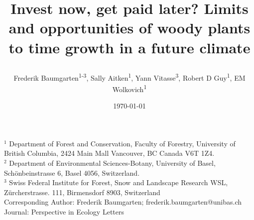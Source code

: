 \documentclass{article}
\begin{document}
	
	
	\title{Invest now, get paid later? Limits and opportunities of woody plants to time growth in a future climate %
		
		
		
		
	
	} 
	
	\date{\today}
	\author{Frederik Baumgarten\textsuperscript{1-3}, Sally Aitken\textsuperscript{1}, Yann Vitasse\textsuperscript{3}, Robert D Guy\textsuperscript{1}, EM Wolkovich\textsuperscript{1}}
	\maketitle
	
	$^1$ Department of Forest and Conservation, Faculty of Forestry, University of British Columbia, 2424 Main Mall
	Vancouver, BC Canada V6T 1Z4. \\
	
	$^2$  
	Department of Environmental Sciences-Botany, University of Basel, Schönbeinstrasse 6, Basel 4056, Switzerland. \\
	
	$^3$  
	Swiss Federal Institute for Forest, Snow and Landscape Research WSL, Zürcherstrasse. 111, Birmensdorf 8903, Switzerland
	\\
	
	Corresponding Author: Frederik Baumgarten; frederik.baumgarten@unibas.ch \\
	Journal: Perspective in Ecology Letters
	
	
\end{document}
